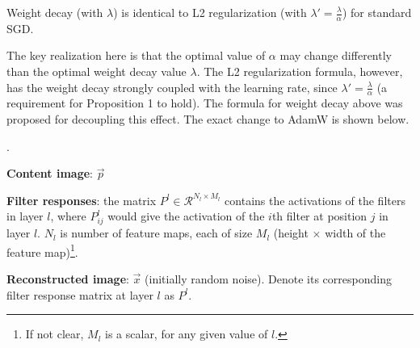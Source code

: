 \documentclass[11pt]{article}
\begin{document}
\begin{definition}[-1em][Proposition 1]
	Weight decay (with $\lambda$) is identical to L2 regularization (with $\lambda' = \frac{\lambda}{\alpha}$) for standard SGD.
\end{definition}

The key realization here is that the optimal value of $\alpha$ may change differently than the optimal weight decay value $\lambda$. The L2 regularization formula, however, has the weight decay strongly coupled with the learning rate, since $\lambda' = \frac{\lambda}{\alpha}$ (a requirement for Proposition 1 to hold). The formula for weight decay above was proposed for decoupling this effect. The exact change to AdamW is shown below. 











































\label{Miscellaneous}





\p {}. 
\begin{compactitem}
	\item \textbf{Content image}: $\vec{p}$
	\item \textbf{Filter responses}: the matrix $P^l \in \mathcal{R}^{N_l \times M_l}$ contains the activations of the filters in layer $l$, where $P_{ij}^l$ would give the activation of the $i$th filter at position $j$ in layer $l$. $N_l$ is number of feature maps, each of size $M_l$ (height $\times$ width of the feature map)\footnote{If not clear, $M_l$ is a scalar, for any given value of $l$.}.
	\item \textbf{Reconstructed image}: $\vec{x}$ (initially random noise). Denote its corresponding filter response matrix at layer $l$ as $P^l$. 
\end{compactitem}
\end{document}

